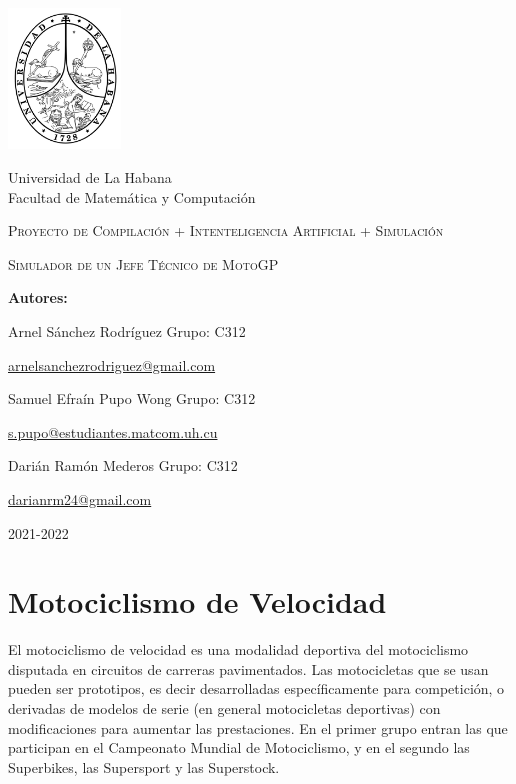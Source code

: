 \documentclass[12pt, letterpaper,spanish]{article}
\theoremstyle{definition}
\theoremstyle{remark}
\begin{document}
	
\begin{titlepage}
	\begin{center}
		\includegraphics[width = 3cm]{escudoUH} 
	\end{center}
	\begin{center}
		Universidad de La Habana \\\vspace{0.2cm} Facultad de Matemática y Computación
	\end{center}
	\centering
	\vspace{1cm} \par
	{\scshape\Large Proyecto de Compilación + Intenteligencia Artificial + Simulación\par}
	\vspace{5mm} \par
	{\scshape\Huge Simulador de un Jefe Técnico de MotoGP\par}
	\vspace{5mm} \par
	\vfill
	{\Large \textbf{Autores:} \par}
	{\large Arnel Sánchez Rodríguez \space Grupo: C312 \par}
	\href{mailto:arnelsanchezrodriguez@gmail.com}{arnelsanchezrodriguez@gmail.com}\par
	\vspace{3mm} \par
	{\large Samuel Efraín Pupo Wong \space Grupo: C312 \par}
	\href{mailto:s.pupo@estudiantes.matcom.uh.cu}{s.pupo@estudiantes.matcom.uh.cu}
	\vspace{3mm} \par
	{\large Darián Ramón Mederos \space Grupo: C312 \par}
	\href{mailto:darianrm24@gmail.com}{darianrm24@gmail.com}
	\vspace{3mm} \par
	\vfill
	{\Large 2021-2022 \par}
\end{titlepage}	
\pagebreak
\tableofcontents
\pagebreak
\section{Motociclismo de Velocidad}
	El motociclismo de velocidad es una modalidad deportiva del motociclismo disputada en circuitos de carreras pavimentados. Las motocicletas que se usan pueden ser prototipos, es decir desarrolladas específicamente para competición, o derivadas de modelos de serie (en general motocicletas deportivas) con modificaciones para aumentar las prestaciones. En el primer grupo entran las que participan en el Campeonato Mundial de Motociclismo, y en el segundo las Superbikes, las Supersport y las Superstock.
	
\end{document}
